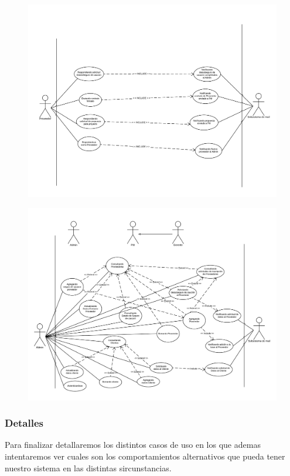 \begin{figure}[H]
\centering
\includegraphics[width=\linewidth]{diag/viejos/cu5.pdf}
\end{figure}

\begin{figure}[H]
\centering
\includegraphics[width=\linewidth]{diag/viejos/cu6.pdf}
\end{figure}

	\subsubsection{Detalles}
Para finalizar detallaremos los distintos casos de uso en los que ademas intentaremos ver cuales son los comportamientos alternativos que pueda tener nuestro sistema en las distintas sircunstancias.

